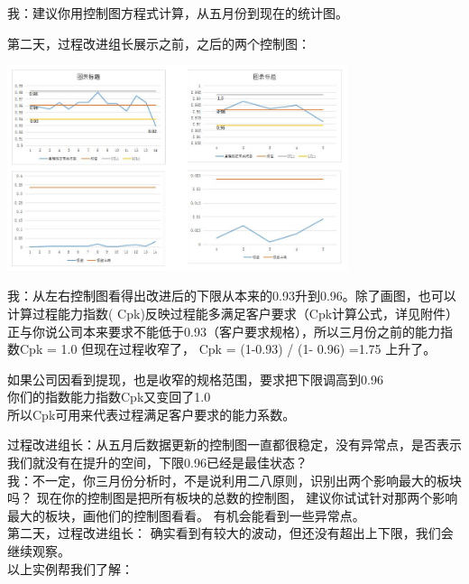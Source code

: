 我：建议你用控制图方程式计算，从五月份到现在的统计图。

第二天，过程改进组长展示之前，之后的两个控制图：

\begin{description}
\item[]
\end{description}


\includegraphics[width=10cm]{控制图0.jpg}

我：从左右控制图看得出改进后的下限从本来的0.93升到0.96。除了画图，也可以计算过程能力指数(
Cpk)反映过程能多满足客户要求（Cpk计算公式，详见附件）\\
正与你说公司本来要求不能低于0.93（客户要求规格），所以三月份之前的能力指数Cpk
= 1.0 但现在过程收窄了， Cpk = (1-0.93) / (1- 0.96) =1.75 上升了。

如果公司因看到提现，也是收窄的规格范围，要求把下限调高到0.96\\
你们的指数能力指数Cpk又变回了1.0\\
所以Cpk可用来代表过程满足客户要求的能力系数。

过程改进组长：从五月后数据更新的控制图一直都很稳定，没有异常点，是否表示我们就没有在提升的空间，下限0.96已经是最佳状态？\\
我：不一定，你三月份分析时，不是说利用二八原则，识别出两个影响最大的板块吗？
现在你的控制图是把所有板块的总数的控制图，
建议你试试针对那两个影响最大的板块，画他们的控制图看看。
有机会能看到一些异常点。\\
第二天，过程改进组长：
确实看到有较大的波动，但还没有超出上下限，我们会继续观察。\\
以上实例帮我们了解：

